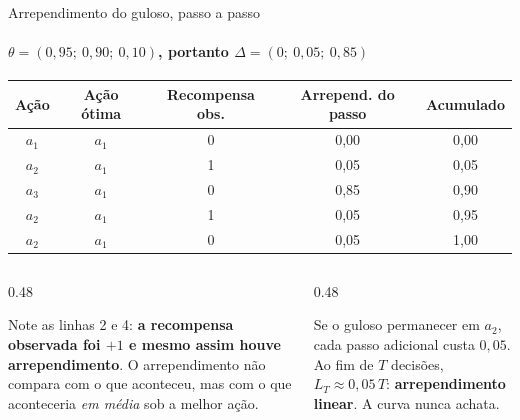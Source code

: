 \documentclass[aspectratio=169, 10pt]{beamer}
\newcommand{\gap}{\Delta}
\newcommand{\Reg}{L}
\begin{document}
\begin{frame}{Arrependimento do guloso, passo a passo}
  \framesubtitle{$\theta = (0{,}95;\ 0{,}90;\ 0{,}10)$, portanto $\gap = (0;\ 0{,}05;\ 0{,}85)$}

  \centering
  \begin{tabular}{ccccc}
    \toprule
    \textbf{Ação} & \textbf{Ação ótima} & \textbf{Recompensa obs.}
      & \textbf{Arrepend. do passo} & \textbf{Acumulado} \\
    \midrule
    $a_1$ & $a_1$ & 0 & 0{,}00 & 0{,}00 \\
    $a_2$ & $a_1$ & 1 & 0{,}05 & 0{,}05 \\
    $a_3$ & $a_1$ & 0 & 0{,}85 & 0{,}90 \\
    $a_2$ & $a_1$ & 1 & 0{,}05 & 0{,}95 \\
    $a_2$ & $a_1$ & 0 & 0{,}05 & 1{,}00 \\
    \bottomrule
  \end{tabular}

  \vspace{0.8em}
  \begin{columns}[T]
    \begin{column}{0.48\textwidth}
      \begin{alertabox}
        Note as linhas 2 e 4: \textbf{a recompensa observada foi $+1$ e
        mesmo assim houve arrependimento}. O arrependimento não compara com
        o que aconteceu, mas com o que aconteceria \emph{em média} sob a
        melhor ação.
      \end{alertabox}
    \end{column}
    \begin{column}{0.48\textwidth}
      \begin{ideiabox}
        Se o guloso permanecer em $a_2$, cada passo adicional custa
        $0{,}05$. Ao fim de $T$ decisões, $\Reg_T \approx 0{,}05\,T$:
        \textbf{arrependimento linear}. A curva nunca achata.
      \end{ideiabox}
    \end{column}
  \end{columns}
\end{frame}
\end{document}
